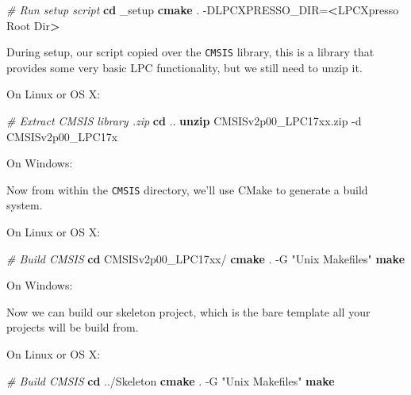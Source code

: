 \documentclass[]{article}
\newenvironment{Shaded}{\begin{snugshade}}{\end{snugshade}}
\newcommand{\KeywordTok}[1]{\textcolor[rgb]{0.13,0.29,0.53}{\textbf{{#1}}}}
\newcommand{\StringTok}[1]{\textcolor[rgb]{0.31,0.60,0.02}{{#1}}}
\newcommand{\CommentTok}[1]{\textcolor[rgb]{0.56,0.35,0.01}{\textit{{#1}}}}
\newcommand{\NormalTok}[1]{{#1}}
\begin{document}
\begin{Shaded}
\begin{Highlighting}[]
    \CommentTok{# Run setup script}
    \KeywordTok{cd} \NormalTok{_setup}
    \KeywordTok{cmake} \NormalTok{. -DLPCXPRESSO_DIR=}\KeywordTok{<}\NormalTok{LPCXpresso Root Dir}\KeywordTok{>}
\end{Highlighting}
\end{Shaded}

During setup, our script copied over the \texttt{CMSIS} library, this is
a library that provides some very basic LPC functionality, but we still
need to unzip it.

On Linux or OS X:

\begin{Shaded}
\begin{Highlighting}[]
    \CommentTok{# Extract CMSIS library .zip}
    \KeywordTok{cd} \NormalTok{..}
    \KeywordTok{unzip} \NormalTok{CMSISv2p00_LPC17xx.zip -d CMSISv2p00_LPC17x}
\end{Highlighting}
\end{Shaded}

On Windows:


Now from within the \texttt{CMSIS} directory, we'll use CMake to
generate a build system.

On Linux or OS X:

\begin{Shaded}
\begin{Highlighting}[]
    \CommentTok{# Build CMSIS}
    \KeywordTok{cd} \NormalTok{CMSISv2p00_LPC17xx/}
    \KeywordTok{cmake} \NormalTok{. -G }\StringTok{"Unix Makefiles"}
    \KeywordTok{make}
\end{Highlighting}
\end{Shaded}

On Windows:


Now we can build our skeleton project, which is the bare template all
your projects will be build from.

On Linux or OS X:

\begin{Shaded}
\begin{Highlighting}[]
    \CommentTok{# Build CMSIS}
    \KeywordTok{cd} \NormalTok{../Skeleton}
    \KeywordTok{cmake} \NormalTok{. -G }\StringTok{"Unix Makefiles"}
    \KeywordTok{make}
\end{Highlighting}
\end{Shaded}
\end{document}
